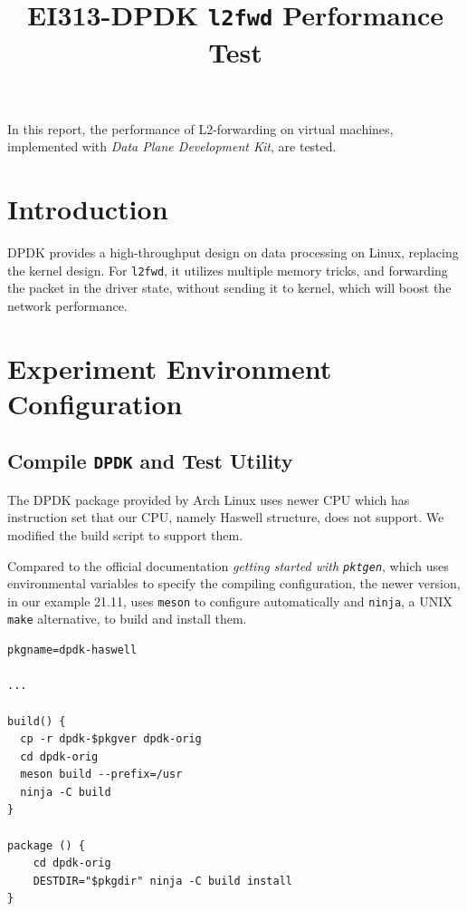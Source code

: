 \documentclass[12pt]{article}
\title{EI313-DPDK \texttt{l2fwd} Performance Test}
\begin{document}
\maketitle

In this report, the performance of L2-forwarding on virtual machines, implemented with \emph{Data Plane Development Kit}, are tested.

\section{Introduction}

DPDK provides a high-throughput design on data processing on Linux, replacing the kernel design. For \texttt{l2fwd}, it utilizes multiple memory tricks, and forwarding the packet in the driver state, without sending it to kernel, which will boost the network performance.

\section{Experiment Environment Configuration}

\subsection{Compile \texttt{DPDK} and Test Utility}

The DPDK package provided by Arch Linux uses newer CPU which has instruction set that our CPU, namely Haswell structure, does not support. We modified the build script to support them.

Compared to the official documentation \emph{getting started with \texttt{pktgen}}, which uses environmental variables to specify the compiling configuration, the newer version, in our example 21.11, uses \texttt{meson} to configure automatically and \texttt{ninja}, a UNIX \texttt{make} alternative, to build and install them.

\begin{lstlisting}[caption={Build Script of \texttt{dpdk}}]
pkgname=dpdk-haswell

...

build() {
  cp -r dpdk-$pkgver dpdk-orig
  cd dpdk-orig
  meson build --prefix=/usr
  ninja -C build
}

package () {
    cd dpdk-orig
    DESTDIR="$pkgdir" ninja -C build install
}

\end{lstlisting}
\end{document}
